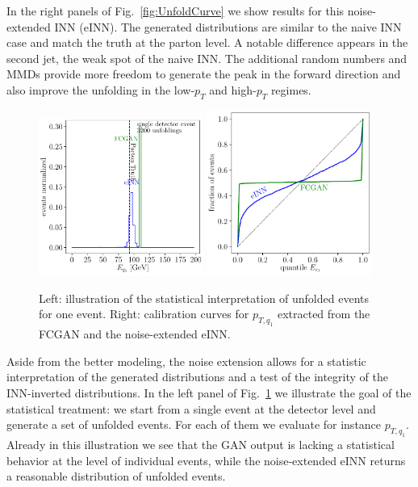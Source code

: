 In the right panels of Fig.~\ref{fig:UnfoldCurve} we show results for
this noise-extended INN (eINN). The generated distributions are similar to
the naive INN case and match the truth at the parton level. A notable
difference appears in the second jet, the weak spot of the naive
INN. The additional random numbers and MMDs provide more freedom to
generate the peak in the forward direction and also improve the
unfolding in the low-$p_T$ and high-$p_T$ regimes.\bigskip

\begin{figure}[t]
\includegraphics[page=9, width=0.48\textwidth]{figures/cINN/point1_inn_fcgan}
\includegraphics[page=20, width=0.48\textwidth]{figures/cINN/CalibrationCurveINNFCGAN}
\caption{Left: illustration of the statistical interpretation of
  unfolded events for one event. Right: calibration curves for
  $p_{T,q_1}$ extracted from the FCGAN and the noise-extended eINN.}
\label{fig:quantile1}
\end{figure}

Aside from the better modeling, the noise extension allows for a
statistic interpretation of the generated distributions and a test of
the integrity of the INN-inverted distributions. In the left panel of
Fig.~\ref{fig:quantile1} we illustrate the goal of the statistical
treatment: we start from a single event at the detector level and
generate a set of unfolded events. For each of them we evaluate for
instance $p_{T,q_1}$. Already in this illustration we see that the GAN
output is lacking a statistical behavior at the level of individual
events, while the noise-extended eINN returns a reasonable
distribution of unfolded events.

